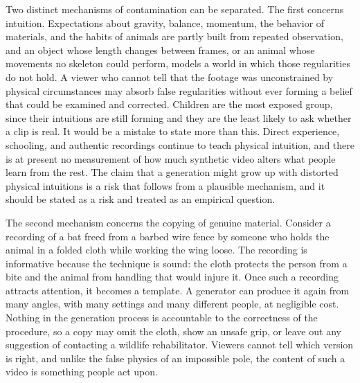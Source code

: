 \documentclass[12pt]{article}
\theoremstyle{plain}
\theoremstyle{definition}
\theoremstyle{remark}
\begin{document}
Two distinct mechanisms of contamination can be separated. The first concerns intuition. Expectations about gravity, balance, momentum, the behavior of materials, and the habits of animals are partly built from repeated observation, and an object whose length changes between frames, or an animal whose movements no skeleton could perform, models a world in which those regularities do not hold. A viewer who cannot tell that the footage was unconstrained by physical circumstances may absorb false regularities without ever forming a belief that could be examined and corrected. Children are the most exposed group, since their intuitions are still forming and they are the least likely to ask whether a clip is real. It would be a mistake to state more than this. Direct experience, schooling, and authentic recordings continue to teach physical intuition, and there is at present no measurement of how much synthetic video alters what people learn from the rest. The claim that a generation might grow up with distorted physical intuitions is a risk that follows from a plausible mechanism, and it should be stated as a risk and treated as an empirical question.

The second mechanism concerns the copying of genuine material. Consider a recording of a bat freed from a barbed wire fence by someone who holds the animal in a folded cloth while working the wing loose. The recording is informative because the technique is sound: the cloth protects the person from a bite and the animal from handling that would injure it. Once such a recording attracts attention, it becomes a template. A generator can produce it again from many angles, with many settings and many different people, at negligible cost. Nothing in the generation process is accountable to the correctness of the procedure, so a copy may omit the cloth, show an unsafe grip, or leave out any suggestion of contacting a wildlife rehabilitator. Viewers cannot tell which version is right, and unlike the false physics of an impossible pole, the content of such a video is something people act upon.
\end{document}
